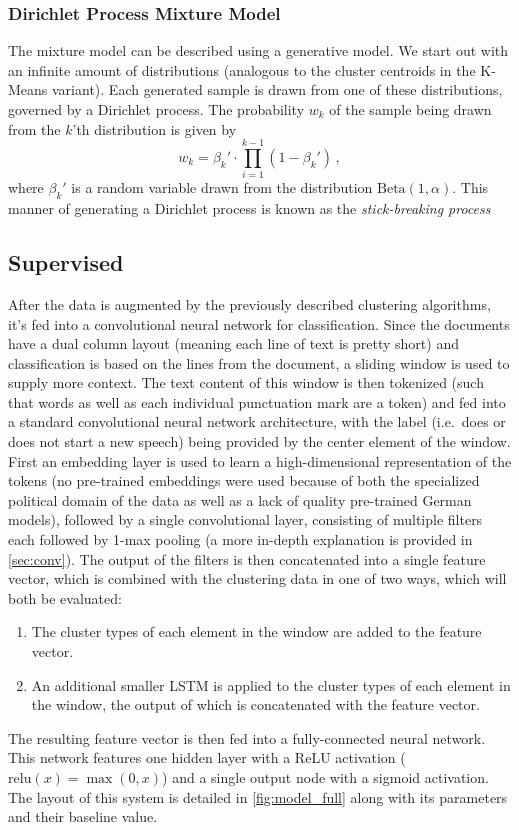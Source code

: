 \subsubsection{Dirichlet Process Mixture Model}
The mixture model can be described using a generative model. We start out with
an infinite amount of distributions (analogous to the cluster centroids in the
K-Means variant). Each generated sample is drawn from one of these
distributions, governed by a Dirichlet process. The probability $w_k$ of the
sample being drawn from the $k$'th distribution is given by
\begin{equation}
  w_k = \beta_k' \cdot \prod_{i=1}^{k-1} (1 - \beta_k')\,,
\end{equation}
where $\beta_k'$ is a random variable drawn from the distribution
$\mathrm{Beta}(1, \alpha)$. This manner of generating a Dirichlet process is
known as the \emph{stick-breaking process}


\subsection{Supervised}%
\label{sec:sup}
After the data is augmented by the previously described clustering algorithms,
it's fed into a convolutional neural network for classification. Since the
documents have a dual column layout (meaning each line of text is pretty short)
and classification is based on the lines from the document, a sliding window is
used to supply more context. The text content of this window is then tokenized
(such that words as well as each individual punctuation mark are a token)
and fed into a standard convolutional neural network
architecture\citep{kim2014conv}, with the label (i.e.\ does or does not start a
new speech) being provided by the center element of the window.
First an embedding layer is used to learn a high-dimensional representation of
the tokens (no pre-trained embeddings were used because of both the specialized
political domain of the data as well as a lack of quality pre-trained German
models), followed by a single convolutional layer, consisting of multiple
filters each followed by 1-max pooling (a more in-depth explanation is provided
in \cref{sec:conv}). The output of the filters is then concatenated into a
single feature vector, which is combined with the clustering data in one of two
ways, which will both be evaluated:
\begin{enumerate}
  \item The cluster types of each element in the window are added to the
    feature vector.
  \item An additional smaller LSTM is applied to the cluster types of each
    element in the window, the output of which is concatenated with the feature
    vector.
\end{enumerate}
The resulting feature vector is then fed into a fully-connected neural network.
This network features one hidden layer with a ReLU activation ($\mathrm{relu}(x)
= \max(0, x)$) and a single output node with a sigmoid activation. The layout of
this system is detailed in \cref{fig:model_full} along with its parameters and
their baseline value.

